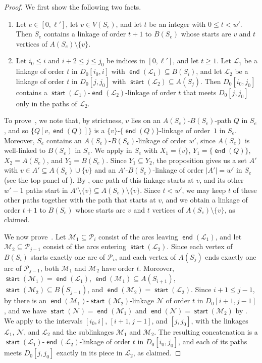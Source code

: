 \documentclass[fontsize=12pt,leading=14pt]{fullpaper}
\DeclareMathOperator{\st}{\mathsf{start}}
\DeclareMathOperator{\en}{\mathsf{end}}
\newcommand{\Lcal}{\mathcal{L}}
\newcommand{\Mcal}{\mathcal{M}}
\newcommand{\Ncal}{\mathcal{N}}
\newcommand{\Pcal}{\mathcal{P}}
\begin{document}
\begin{proof}
  We first show the following two facts.
  \begin{enumerate}[label=\textnormal{(\alph*)}]
    \item\label{item:spaced-add} Let $e\in[0,\ell']$, let $v\in V(S_e)$, and let $t$ be an integer with $0\le t<w'$.
      Then $S_e$ contains a linkage of order $t+1$ to $B(S_e)$ whose starts are $v$ and $t$ vertices of $A(S_e)\setminus\{v\}$.
    \item\label{item:spaced-join} Let $i_0\le i$ and $i+2\le j\le j_0$ be indices in $[0,\ell']$, and let $t\ge1$.
      Let $\Lcal_1$ be a linkage of order $t$ in $D_0[i_0,i]$ with $\en(\Lcal_1)\subseteq B(S_i)$, and let $\Lcal_2$ be a linkage of order $t$ in $D_0[j,j_0]$ with $\st(\Lcal_2)\subseteq A(S_j)$.
      Then $D_0[i_0,j_0]$ contains a $\st(\Lcal_1)$-$\en(\Lcal_2)$-linkage of order $t$ that meets $D_0[j,j_0]$ only in the paths of $\Lcal_2$.
  \end{enumerate}
  To prove~, we note that, by strictness, $v$ lies on an $A(S_e)$-$B(S_e)$-path $Q$ in $S_e$, and so $\{Q[v,\en(Q)]\}$ is a $\{v\}$-$\{\en(Q)\}$-linkage of order~$1$ in $S_e$.
  Moreover, $S_e$ contains an $A(S_e)$-$B(S_e)$-linkage of order $w'$, since $A(S_e)$ is well-linked to $B(S_e)$ in $S_e$.
  We apply  in $S_e$ with $X_1=\{v\}$, $Y_1=\{\en(Q)\}$, $X_2=A(S_e)$, and $Y_2=B(S_e)$.
  Since $Y_1\subseteq Y_2$, the proposition gives us a set $A'$ with $v\in A'\subseteq A(S_e)\cup\{v\}$ and an $A'$-$B(S_e)$-linkage of order $|A'|=w'$ in $S_e$ (see the top panel of ).
  By , one path of this linkage starts at $v$, and its other $w'-1$ paths start in $A'\setminus\{v\}\subseteq A(S_e)\setminus\{v\}$.
  Since $t<w'$, we may keep $t$ of these other paths together with the path that starts at $v$, and we obtain a linkage of order $t+1$ to $B(S_e)$ whose starts are $v$ and $t$ vertices of $A(S_e)\setminus\{v\}$, as claimed.

  We now prove~.
  Let $\Mcal_1\subseteq\Pcal_i$ consist of the arcs leaving $\en(\Lcal_1)$, and let $\Mcal_2\subseteq\Pcal_{j-1}$ consist of the arcs entering $\st(\Lcal_2)$.
  Since each vertex of $B(S_i)$ starts exactly one arc of $\Pcal_i$, and each vertex of $A(S_j)$ ends exactly one arc of $\Pcal_{j-1}$, both $\Mcal_1$ and $\Mcal_2$ have order $t$.
  Moreover, $\st(\Mcal_1)=\en(\Lcal_1)$, $\en(\Mcal_1)\subseteq A(S_{i+1})$, $\st(\Mcal_2)\subseteq B(S_{j-1})$, and $\en(\Mcal_2)=\st(\Lcal_2)$.
  Since $i+1\le j-1$, by  there is an $\en(\Mcal_1)$-$\st(\Mcal_2)$-linkage $\Ncal$ of order $t$ in $D_0[i+1,j-1]$, and we have $\st(\Ncal)=\en(\Mcal_1)$ and $\en(\Ncal)=\st(\Mcal_2)$ by .
  We apply  to the intervals $[i_0,i]$, $[i+1,j-1]$, and $[j,j_0]$, with the linkages $\Lcal_1$, $\Ncal$, and $\Lcal_2$ and the sublinkages $\Mcal_1$ and $\Mcal_2$.
  The resulting concatenation is a $\st(\Lcal_1)$-$\en(\Lcal_2)$-linkage of order $t$ in $D_0[i_0,j_0]$, and each of its paths meets $D_0[j,j_0]$ exactly in its piece in $\Lcal_2$, as claimed.


\end{proof}
\end{document}
